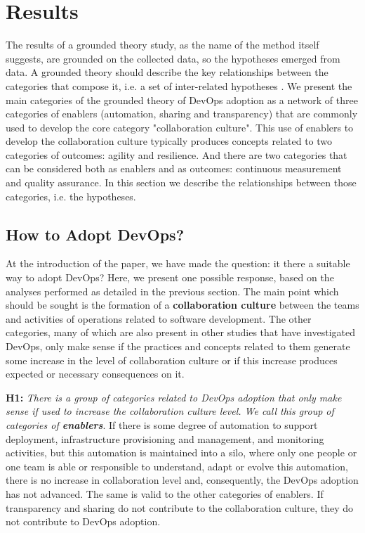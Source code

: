 \section{Results} \label{sec:results}
The results of a grounded theory study, as the name of the method itself suggests, are grounded on the collected data, so the hypotheses emerged from data. A grounded theory should describe the key relationships between the categories that compose it, i.e. a set of inter-related hypotheses \cite{hoda2017becoming}. We present the main categories of the grounded theory of DevOps adoption as a network of three categories of enablers (automation, sharing and transparency) that are commonly used to develop the core category "collaboration culture". This use of enablers to develop the collaboration culture typically produces concepts related to two categories of outcomes: agility and resilience. And there are two categories that can be considered both as enablers and as outcomes: continuous measurement and quality assurance. In this section we describe the relationships between those categories, i.e. the hypotheses.

\subsection{How to Adopt DevOps?}
At the introduction of the paper, we have made the question: it there a
suitable way to adopt DevOps? Here, we present one possible response, based
on the analyses performed as detailed in the previous section. The main point
which should be sought is the formation of a \textbf{collaboration culture}
between the teams and activities of operations related to software development.
The other categories, many of which are also present in other studies that have
investigated DevOps, only make sense if the practices and concepts related to them generate some increase in the level of collaboration culture or if this increase produces expected or necessary consequences on it.

\textbf{H1:} \textit{There is a group of categories related to DevOps adoption that only make sense if used to increase the collaboration culture level. We call this group of categories of \textbf{enablers}}. If there is some degree of automation to support deployment, infrastructure provisioning and management, and monitoring activities, but this automation is maintained into a silo, where only one people or one team is able or responsible to understand, adapt or evolve this automation, there is no increase in collaboration level and, consequently, the DevOps adoption has not advanced. The same is valid to the other categories of enablers. If transparency and sharing do not contribute to the collaboration culture, they do not contribute to DevOps adoption.

